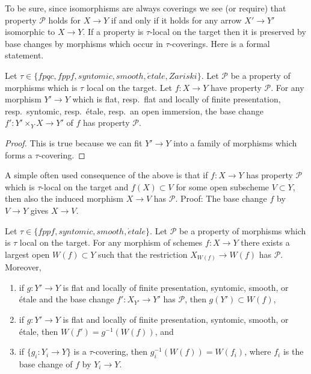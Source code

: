 \noindent
To be sure, since isomorphisms are always coverings
we see (or require) that property $\mathcal{P}$ holds for $X \to Y$
if and only if it holds for any arrow $X' \to Y'$ isomorphic to $X \to Y$.
If a property is $\tau$-local on the target then it is preserved
by base changes by morphisms which occur in $\tau$-coverings. Here
is a formal statement.

\begin{lemma}
\label{lemma-pullback-property-local-target}
Let $\tau \in \{fpqc, fppf, syntomic, smooth, \acute{e}tale, Zariski\}$.
Let $\mathcal{P}$ be a property of morphisms which is $\tau$ local
on the target. Let $f : X \to Y$ have property $\mathcal{P}$.
For any morphism $Y' \to Y$ which is
flat, resp.\ flat and locally of finite presentation, resp.\ syntomic,
resp.\ \'etale, resp.\ an open immersion, the base change
$f' : Y' \times_Y X \to Y'$ of $f$ has property $\mathcal{P}$.
\end{lemma}

\begin{proof}
This is true because we can fit $Y' \to Y$ into a family of
morphisms which forms a $\tau$-covering.
\end{proof}

\noindent
A simple often used consequence of the above is that if
$f : X \to Y$ has property $\mathcal{P}$ which is $\tau$-local
on the target and $f(X) \subset V$
for some open subscheme $V \subset Y$, then also the induced
morphism $X \to V$ has $\mathcal{P}$. Proof: The base change
$f$ by $V \to Y$ gives $X \to V$.

\begin{lemma}
\label{lemma-largest-open-of-the-base}
Let $\tau \in \{fppf, syntomic, smooth, \acute{e}tale\}$.
Let $\mathcal{P}$ be a property of morphisms which is $\tau$ local
on the target. For any morphism of schemes $f : X \to Y$ there exists
a largest open $W(f) \subset Y$ such that the restriction
$X_{W(f)} \to W(f)$ has $\mathcal{P}$. Moreover,
\begin{enumerate}
\item if $g : Y' \to Y$ is flat and locally of finite presentation,
syntomic, smooth, or \'etale and the base change $f' : X_{Y'} \to Y'$
has $\mathcal{P}$, then $g(Y') \subset W(f)$,
\item if $g : Y' \to Y$ is flat and locally of finite presentation,
syntomic, smooth, or \'etale, then $W(f') = g^{-1}(W(f))$, and
\item if $\{g_i : Y_i \to Y\}$ is a $\tau$-covering, then
$g_i^{-1}(W(f)) = W(f_i)$, where $f_i$ is the base change of $f$
by $Y_i \to Y$.
\end{enumerate}
\end{lemma}


